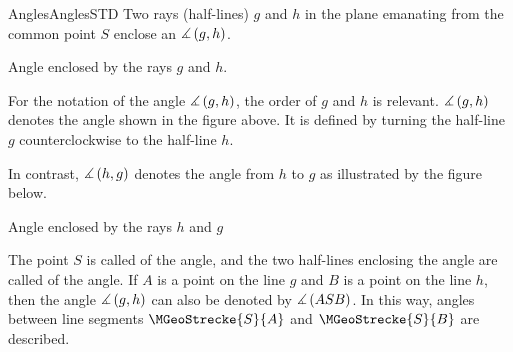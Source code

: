 \begin{MXContent}{Angles}{Angles}{STD}
Two rays (half-lines) $g$ and $h$ in the plane emanating from the common
point $S$ enclose an  $\measuredangle\left(g, h\right)$.

\begin{center}
\par
Angle enclosed by the rays $g$ and $h$.
\end{center}

For the notation of the angle $\measuredangle \left( g, h \right)$, 
the order of $g$ and $h$ is relevant. $\measuredangle \left( g, h \right)$
denotes the angle shown in the figure above. It is defined by
turning the half-line $g$ counterclockwise to the half-line $h$.

In contrast, $\measuredangle \left( h, g \right)$ denotes the angle from 
$h$ to $g$ as illustrated by the figure below.


\begin{center}
\par
Angle enclosed by the rays $h$ and $g$
\end{center}

The point $S$ is called  of the angle, and 
the two half-lines enclosing the angle are called  of the angle. 
If $A$ is a point on the line $g$ and $B$ is a point on the line $h$, then 
the angle $\measuredangle \left( g, h \right)$ can also be denoted by 
$\measuredangle \left( A S B \right)$. In this way, angles between line segments 
$\MGeoStrecke{S}{A}$ and $\MGeoStrecke{S}{B}$ are described.


\end{MXContent}
